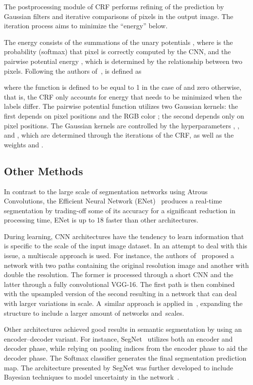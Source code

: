\documentclass[sensors,article,accept,moreauthors,pdftex]{Definitions/mdpi}
\begin{document}
The postprocessing module of CRF performs refining of the prediction by Gaussian filters and iterative comparisons of pixels in the output image. The iteration process aims to minimize the ``energy''  below.


The energy consists of the summations of the unary potentials , where  is the probability (softmax) that pixel  is correctly computed by the CNN, and the pairwise potential energy , which is determined by the relationship between two pixels.
Following the authors of~\cite{CRF},  is defined as

where the function  is defined to be equal to 1 in the case of  and zero otherwise, that is, the CRF only accounts for energy that needs to be minimized when the labels differ. The pairwise potential function utilizes two Gaussian kernels: the first depends on pixel positions  and the RGB color ; the second depends only on pixel positions. The Gaussian kernels are controlled by the hyperparameters , , and  , which are determined through the iterations of the CRF, as well as the weights  and .


\subsection{Other Methods}
In contrast to the large scale of segmentation networks using Atrous Convolutions, the Efficient Neural Network (ENet)~\cite{Enet} produces a real-time segmentation by trading-off some of its accuracy for a significant reduction in processing time, ENet is up to 18 faster than other architectures.

During learning, CNN architectures have the tendency to learn information that is specific to the scale of the input image dataset. In an attempt to deal with this issue, a multiscale approach is used. For instance, the authors of~\cite{Multi-scale-Raj} proposed a network with two paths containing the original resolution image and another with double the resolution. The former is processed through a short CNN and the latter through a fully convolutional VGG-16. The first path is then combined with the upsampled version of the second resulting in a network that can deal with larger variations in scale. \mbox{A similar} approach is applied in~\cite{Multi-scale-Eigen,Multi-scale-Roy,Multi-scale-Bian}, expanding the structure to include a larger amount of networks and~scales.

Other architectures achieved good results in semantic segmentation by using an encoder--decoder variant. For instance, SegNet~\cite{Segnet} utilizes both an encoder and decoder phase, while relying on pooling indices from the encoder phase to aid the decoder phase. The Softmax classifier generates the final segmentation prediction map. The architecture presented by SegNet was further developed to include Bayesian techniques to model uncertainty in the network~\cite{Bayesian-SegNet}.
\end{document}
